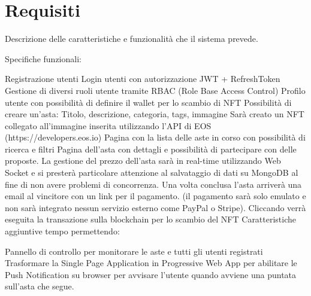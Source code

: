\section{Requisiti}
Descrizione delle caratteristiche e funzionalità che il sistema prevede.

Specifiche funzionali:

Registrazione utenti
Login utenti con autorizzazione JWT + RefreshToken
Gestione di diversi ruoli utente tramite RBAC (Role Base Access Control)
Profilo utente con possibilità di definire il wallet per lo scambio di NFT
Possibilità di creare un’asta:
Titolo, descrizione, categoria, tags, immagine
Sarà creato un NFT collegato all’immagine inserita utilizzando l’API di EOS (https://developers.eos.io)
Pagina con la lista delle aste in corso con possibilità di ricerca e filtri
Pagina dell’asta con dettagli e possibilità di partecipare con delle proposte. La gestione del prezzo dell’asta sarà in real-time utilizzando Web Socket e si presterà particolare attenzione al salvataggio di dati su MongoDB al fine di non avere problemi di concorrenza.
Una volta conclusa l’asta arriverà una email al vincitore con un link per il pagamento. (il pagamento sarà solo emulato e non sarà integrato nessun servizio esterno come PayPal o Stripe). Cliccando verrà eseguita la transazione sulla blockchain per lo scambio del NFT
Caratteristiche aggiuntive tempo permettendo:

Pannello di controllo per monitorare le aste e tutti gli utenti registrati
Trasformare la Single Page Application in Progressive Web App per abilitare le Push Notification su browser per avvisare l’utente quando avviene una puntata sull’asta che segue.